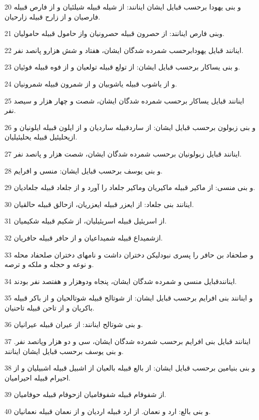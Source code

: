 \par 20 و بنی یهودا برحسب قبایل ایشان اینانند: از شیله قبیله شیلئیان و از فارص قبیله فارصیان و از زارح قبیله زارحیان. 
\par 21 وبنی فارص اینانند: از حصرون قبیله حصرونیان واز حامول قبیله حامولیان.
\par 22 اینانند قبایل یهودابرحسب شمرده شدگان ایشان، هفتاد و شش هزارو پانصد نفر.
\par 23 و بنی یساکار برحسب قبایل ایشان: از تولع قبیله تولعیان و از فوه قبیله فوئیان.
\par 24 و از یاشوب قبیله یاشوبیان و از شمرون قبیله شمرونیان.
\par 25 اینانند قبایل یساکار برحسب شمرده شدگان ایشان، شصت و چهار هزار و سیصد نفر.
\par 26 و بنی زبولون برحسب قبایل ایشان: از ساردقبیله ساردیان و از ایلون قبیله ایلونیان و ازیحلیئیل قبیله یحلیئیلیان.
\par 27 اینانند قبایل زبولونیان برحسب شمرده شدگان ایشان، شصت هزار و پانصد نفر.
\par 28 و بنی یوسف برحسب قبایل ایشان: منسی و افرایم.
\par 29 و بنی منسی: از ماکیر قبیله ماکیریان وماکیر جلعاد را آورد و از جلعاد قبیله جلعادیان.
\par 30 اینانند بنی جلعاد: از ایعزر قبیله ایعزریان، ازحالق قبیله حالقیان.
\par 31 از اسریئیل قبیله اسریئیلیان، از شکیم قبیله شکیمیان.
\par 32 ازشمیداع قبیله شمیداعیان و از حافر قبیله حافریان.
\par 33 و صلحفاد بن حافر را پسری نبودلیکن دختران داشت و نامهای دختران صلحفاد محله و نوعه و حجله و ملکه و ترصه.
\par 34 اینانندقبایل منسی و شمرده شدگان ایشان، پنجاه ودوهزار و هفتصد نفر بودند.
\par 35 و اینانند بنی افرایم برحسب قبایل ایشان: از شوتالح قبیله شوتالحیان و از باکر قبیله باکریان و از تاحن قبیله تاحنیان.
\par 36 و بنی شوتالح اینانند: از عیران قبیله عیرانیان.
\par 37 اینانند قبایل بنی افرایم برحسب شمرده شدگان ایشان، سی و دو هزار وپانصد نفر. و بنی یوسف برحسب قبایل ایشان اینانند.
\par 38 و بنی بنیامین برحسب قبایل ایشان: از بالع قبیله بالعیان از اشبیل قبیله اشبیلیان و از احیرام قبیله احیرامیان.
\par 39 از شفوفام قبیله شفوفامیان ازحوفام قبیله حوفامیان.
\par 40 و بنی بالع: ارد و نعمان. از ارد قبیله اردیان و از نعمان قبیله نعمانیان.
